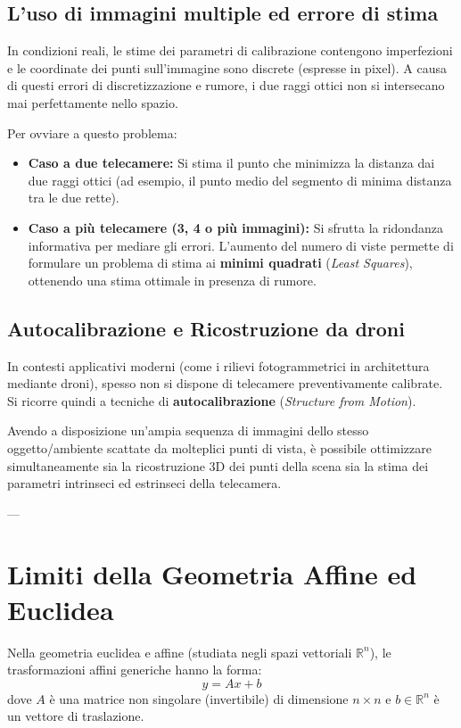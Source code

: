 \subsection{L'uso di immagini multiple ed errore di stima}
In condizioni reali, le stime dei parametri di calibrazione contengono imperfezioni e le coordinate dei punti sull'immagine sono discrete (espresse in pixel). A causa di questi errori di discretizzazione e rumore, i due raggi ottici non si intersecano mai perfettamente nello spazio.

Per ovviare a questo problema:
\begin{itemize}
    \item \textbf{Caso a due telecamere:} Si stima il punto che minimizza la distanza dai due raggi ottici (ad esempio, il punto medio del segmento di minima distanza tra le due rette).
    \item \textbf{Caso a più telecamere (3, 4 o più immagini):} Si sfrutta la ridondanza informativa per mediare gli errori. L'aumento del numero di viste permette di formulare un problema di stima ai \textbf{minimi quadrati} (\emph{Least Squares}), ottenendo una stima ottimale in presenza di rumore.
\end{itemize}

\subsection{Autocalibrazione e Ricostruzione da droni}
In contesti applicativi moderni (come i rilievi fotogrammetrici in architettura mediante droni), spesso non si dispone di telecamere preventivamente calibrate. Si ricorre quindi a tecniche di \textbf{autocalibrazione} (\emph{Structure from Motion}). 

Avendo a disposizione un'ampia sequenza di immagini dello stesso oggetto/ambiente scattate da molteplici punti di vista, è possibile ottimizzare simultaneamente sia la ricostruzione 3D dei punti della scena sia la stima dei parametri intrinseci ed estrinseci della telecamera.

---

\section{Limiti della Geometria Affine ed Euclidea}
Nella geometria euclidea e affine (studiata negli spazi vettoriali $\mathbb{R}^n$), le trasformazioni affini generiche hanno la forma:
\begin{equation}
    y = A x + b
\end{equation}
dove $A$ è una matrice non singolare (invertibile) di dimensione $n \times n$ e $b \in \mathbb{R}^n$ è un vettore di traslazione.

